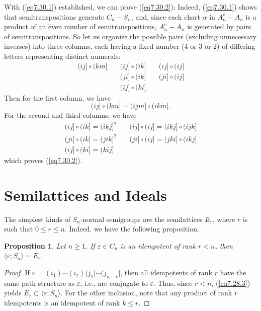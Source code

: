 \documentclass{surv-l}
\numberwithin{equation}{section}
\numberwithin{table}{section}
\numberwithin{figure}{section}
\theoremstyle{plain}
\newtheorem{proposition}[equation]{Proposition}
\theoremstyle{definition}
\begin{document}
With (\ref{eq7.30.1}) established, we can prove (\ref{eq7.30.2}):
Indeed, (\ref{eq7.30.1}) shows that semitranspositions generate
$C_{n}-S_{n}$, and, since each chart $\alpha$ in $A_{n}^{c}-A_{n}$
is a product of an even number of semitranspositions,
$A_{n}^{c}-A_{n}$ is generated by pairs of semitranspositions. So
let us organize the possible pairs (excluding unnecessary
inverses) into three columns, each having a fixed number (4 or 3
or 2) of differing letters representing distinct numerals:
\[
\begin{array}{lll}
(ij]\circ (km] &\quad (ij]\circ(ik] &\quad(ij]\circ(ij] \\
&\quad (ji]\circ(ik] &\quad (ji]\circ(ij] \\
&\quad (ij]\circ(ki] &
\end{array}
\]
Then for the first column, we have
\[
(ij]\circ (km]=(ijm]\circ (ikm].
\]
For the second and third columns, we have
\[
\begin{array}{ll}
(ij]\circ (ik]=(ikj]^{2} &\quad (ij]\circ (ij]=(ikj]\circ (ijk] \\
(ji]\circ (ik]=(jik]^{2} &\quad (ji]\circ (ij]=(jki]\circ (ikj] \\
(ij]\circ(ki]=(kij] &
\end{array}
\]
which proves (\ref{eq7.30.2}).

\section{Semilattices and Ideals}\label{sec7.31}

The simplest kinds of $S_{n}$-normal semigroups are the
semilattices $E_{r}$, where $r$ is such that
$0\leq r\leq n$. Indeed, we have the following proposition.

\begin{proposition}\label{prop2.31.1}
Let $n \geq 1$. If $\varepsilon \in C_{n}$ is an idempotent of
rank $r<n$, then $\langle\varepsilon; S_{n}\rangle=E_{r}$.
\end{proposition}

\begin{proof} If $\varepsilon =(i_{1})\cdots(i_{r})(j_{1}]\cdots(j_{n-r}]$,
then all idempotents of rank $r$ have the same path structure as
$\varepsilon$, i.e., are conjugate to $\varepsilon$. Thus, since
$r<n$, (\ref{eq7.28.3}) yields
$E_{r}\subset\langle \varepsilon;S_{n}\rangle$. For the other inclusion, note
that any product of rank $r$ idempotents is an idempotent of rank
$k\leq r.$
\end{proof}
\end{document}

